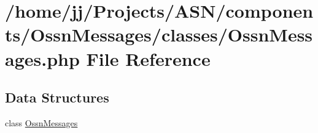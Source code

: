 \hypertarget{classes_2_ossn_messages_8php}{}\section{/home/jj/\+Projects/\+A\+S\+N/components/\+Ossn\+Messages/classes/\+Ossn\+Messages.php File Reference}
\label{classes_2_ossn_messages_8php}
\subsection*{Data Structures}
\begin{DoxyCompactItemize}
\item 
class \hyperlink{class_ossn_messages}{Ossn\+Messages}
\end{DoxyCompactItemize}
